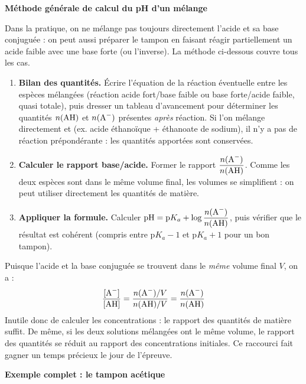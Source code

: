 \documentclass[11pt]{article}
\begin{document}
\textbf{Méthode générale de calcul du pH d'un mélange}\par
Dans la pratique, on ne mélange pas toujours directement l'acide et sa base conjuguée : on peut aussi préparer le tampon en faisant réagir partiellement un acide faible avec une base forte (ou l'inverse). La méthode ci-dessous couvre tous les cas.

\begin{methode}
\begin{enumerate}
\item \textbf{Bilan des quantités.} Écrire l'équation de la réaction éventuelle entre les espèces mélangées (réaction acide fort/base faible ou base forte/acide faible, quasi totale), puis dresser un tableau d'avancement pour déterminer les quantités $n(\ce{AH})$ et $n(\ce{A-})$ présentes \emph{après} réaction. Si l'on mélange directement  et  (ex. acide éthanoïque + éthanoate de sodium), il n'y a pas de réaction prépondérante : les quantités apportées sont conservées.
\item \textbf{Calculer le rapport base/acide.} Former le rapport $\dfrac{n(\ce{A-})}{n(\ce{AH})}$. Comme les deux espèces sont dans le même volume final, les volumes se simplifient : on peut utiliser directement les quantités de matière.
\item \textbf{Appliquer la formule.} Calculer $\text{pH} = \text{p}K_a + \log\dfrac{n(\ce{A-})}{n(\ce{AH})}$, puis vérifier que le résultat est cohérent (compris entre p$K_a - 1$ et p$K_a + 1$ pour un bon tampon).
\end{enumerate}
\end{methode}

\begin{exemplebox}
Puisque l'acide et la base conjuguée se trouvent dans le \emph{même} volume final $V$, on a :
\[ \dfrac{[\ce{A-}]}{[\ce{AH}]} = \dfrac{n(\ce{A-})/V}{n(\ce{AH})/V} = \dfrac{n(\ce{A-})}{n(\ce{AH})} \]
Inutile donc de calculer les concentrations : le rapport des quantités de matière suffit. De même, si les deux solutions mélangées ont le même volume, le rapport des quantités se réduit au rapport des concentrations initiales. Ce raccourci fait gagner un temps précieux le jour de l'épreuve.
\end{exemplebox}

\textbf{Exemple complet : le tampon acétique}\par
\end{document}

